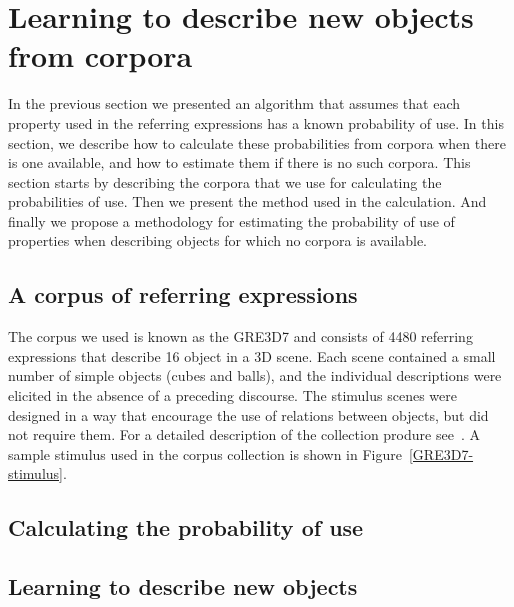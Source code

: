 \section{Learning to describe new objects from corpora}
\label{sec:learning}

In the previous section we presented an algorithm that assumes that each property used in the referring expressions has a known probability of use. In this section, we describe how to calculate these probabilities from corpora when there is one available, and how to estimate them if there is no such corpora. This section starts by describing the corpora that we use for calculating the probabilities of use. Then we present the method used in the calculation. And finally we propose a methodology for estimating the probability of use of properties when describing objects for which no corpora is available. 

\subsection{A corpus of referring expressions}

The corpus we used is known as the GRE3D7 and consists of 4480 referring expressions that describe 16 object in a 3D scene. Each scene contained a small number of simple objects (cubes and balls), and the individual descriptions were elicited in the absence of a preceding discourse. The stimulus scenes were designed in a way that encourage the use of relations between objects, but did not require them. For a detailed description of the collection produre see~\cite[Chapter 5]{viet:gene11}. A sample stimulus used in the corpus collection is shown in Figure~\ref{GRE3D7-stimulus}. 


\subsection{Calculating the probability of use}



\subsection{Learning to describe new objects}
